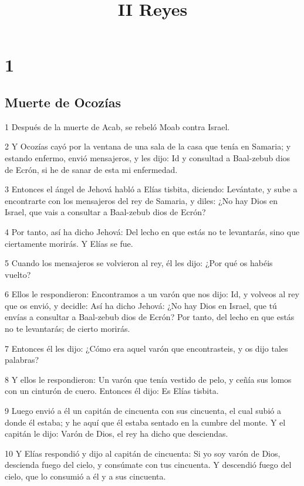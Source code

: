 

\title{II Reyes}

\chapter{1}

\section*{Muerte de Ocozías}

\par 1 Después de la muerte de Acab, se rebeló Moab contra Israel.
\par 2 Y Ocozías cayó por la ventana de una sala de la casa que tenía en Samaria; y estando enfermo, envió mensajeros, y les dijo: Id y consultad a Baal-zebub dios de Ecrón, si he de sanar de esta mi enfermedad.
\par 3 Entonces el ángel de Jehová habló a Elías tisbita, diciendo: Levántate, y sube a encontrarte con los mensajeros del rey de Samaria, y diles: ¿No hay Dios en Israel, que vais a consultar a Baal-zebub dios de Ecrón?
\par 4 Por tanto, así ha dicho Jehová: Del lecho en que estás no te levantarás, sino que ciertamente morirás. Y Elías se fue.
\par 5 Cuando los mensajeros se volvieron al rey, él les dijo: ¿Por qué os habéis vuelto?
\par 6 Ellos le respondieron: Encontramos a un varón que nos dijo: Id, y volveos al rey que os envió, y decidle: Así ha dicho Jehová: ¿No hay Dios en Israel, que tú envías a consultar a Baal-zebub dios de Ecrón? Por tanto, del lecho en que estás no te levantarás; de cierto morirás.
\par 7 Entonces él les dijo: ¿Cómo era aquel varón que encontrasteis, y os dijo tales palabras?
\par 8 Y ellos le respondieron: Un varón que tenía vestido de pelo, y ceñía sus lomos con un cinturón de cuero. Entonces él dijo: Es Elías tisbita.
\par 9 Luego envió a él un capitán de cincuenta con sus cincuenta, el cual subió a donde él estaba; y he aquí que él estaba sentado en la cumbre del monte. Y el capitán le dijo: Varón de Dios, el rey ha dicho que desciendas.
\par 10 Y Elías respondió y dijo al capitán de cincuenta: Si yo soy varón de Dios, descienda fuego del cielo, y consúmate con tus cincuenta. Y descendió fuego del cielo, que lo consumió a él y a sus cincuenta.

